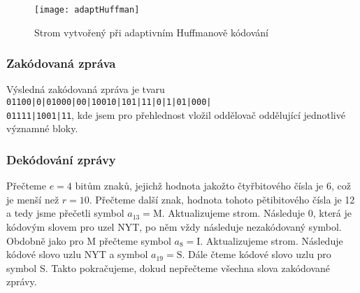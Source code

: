 \begin{figure}[!htb]
\centering
\texttt{[image: adaptHuffman]}
\caption{Strom vytvořený při adaptivním Huffmanově kódování}
\label{adaptivniHuffmanStrom}
\end{figure}

\subsubsection{Zakódovaná zpráva}
Výsledná zakódovaná zpráva je tvaru \texttt{01100|0|01000|00|10010|101|11|0|1|01|000|\\01111|1001|11}, kde jsem pro přehlednost vložil oddělovač \uv{\texttt{|}} oddělující jednotlivé vý\-zna\-mné bloky.

\subsubsection{Dekódování zprávy}
Přečteme $e=4$ bitům znaků, jejichž hodnota jakožto čtyřbitového čísla je 6, což je menší než $r=10$. Přečteme další znak, hodnota tohoto pětibitového čísla je 12 a tedy jsme přečetli symbol $a_{13} = \mathrm{M}$. Aktualizujeme strom. Následuje 0, která je kódovým slovem pro uzel NYT, po něm vždy následuje nezakódovaný symbol. Obdobně jako pro M přečteme symbol $a_8 = \mathrm{I}$. Aktualizujeme strom. Následuje kódové slovo uzlu NYT a symbol $a_{19} = \mathrm{S}$. Dále čteme kódové slovo uzlu pro symbol S. Takto pokračujeme, dokud nepřečteme všechna slova zakódované zprávy.